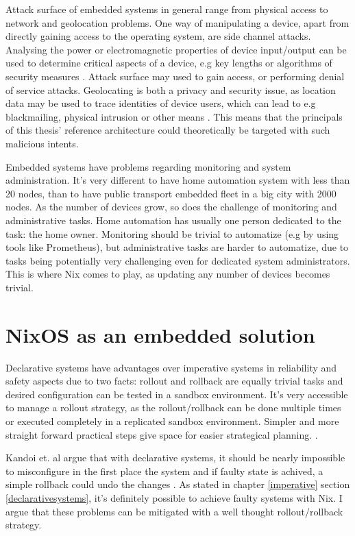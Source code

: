 Attack surface of embedded systems in general range from physical
access to network and geolocation problems. One way of manipulating a
device, apart from directly gaining access to the operating system,
are side channel attacks. Analysing the power or electromagnetic
properties of device input/output can be used to determine critical
aspects of a device, e.g key lengths or algorithms of security
measures \cite{fysarakis2014embedded serpanos2013security}. Attack
surface may used to gain access, or performing denial of service
attacks. Geolocating is both a privacy and security issue, as location
data may be used to trace identities of device users, which can lead
to e.g blackmailing, physical intrusion or other means
\cite{fysarakis2014embedded}. This means that the principals of this
thesis' reference architecture could theoretically be targeted with such malicious
intents.

Embedded systems have problems regarding monitoring and system
administration. It's very different to have home automation system
with less than 20 nodes, than to have public transport embedded fleet
in a big city with 2000 nodes. As the number of devices grow, so does
the challenge of monitoring and administrative tasks. Home automation
has usually one person dedicated to the task: the home owner. Monitoring should be trivial to automatize (e.g by using
tools like Prometheus), but administrative tasks are harder to
automatize, due to tasks being potentially very challenging even for
dedicated system administrators. This is where Nix comes to play, as
updating any number of devices becomes trivial.


\section{NixOS as an embedded solution} \label{nixosassolution}

Declarative systems have advantages over imperative systems in
reliability and safety aspects due to two facts: rollout and rollback
are equally trivial tasks and desired configuration can be tested in a
sandbox environment. It's very accessible to manage a rollout strategy,
as the rollout/rollback can be done multiple times or executed
completely in a replicated sandbox environment. Simpler and more straight forward practical steps give space for
easier strategical planning. \cite{kandoi2021operating}.

Kandoi et. al argue that with declarative systems, it should be nearly
impossible to misconfigure in the first place the system and if faulty
state is achived, a simple rollback could undo the changes
\cite{kandoi2021operating}. As stated in chapter \ref{imperative}
section \ref{declarativesystems}, it's definitely possible to achieve
faulty systems with Nix. I argue that these problems can be mitigated
with a well thought rollout/rollback strategy.

